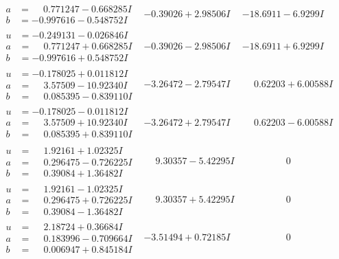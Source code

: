 \documentclass[1p]{elsarticle_modified}
\theoremstyle{definition}
\begin{document}
$$\begin{array}{c|c|c}
\begin{aligned}
a &= \phantom{-}0.771247 - 0.668285 I \\
b &= -0.997616 - 0.548752 I\end{aligned}
 & -0.39026 + 2.98506 I & -18.6911 - 6.9299 I \\ \hline\begin{aligned}
u &= -0.249131 - 0.026846 I \\
a &= \phantom{-}0.771247 + 0.668285 I \\
b &= -0.997616 + 0.548752 I\end{aligned}
 & -0.39026 - 2.98506 I & -18.6911 + 6.9299 I \\ \hline\begin{aligned}
u &= -0.178025 + 0.011812 I \\
a &= \phantom{-}3.57509 - 10.92340 I \\
b &= \phantom{-}0.085395 - 0.839110 I\end{aligned}
 & -3.26472 - 2.79547 I & \phantom{-}0.62203 + 6.00588 I \\ \hline\begin{aligned}
u &= -0.178025 - 0.011812 I \\
a &= \phantom{-}3.57509 + 10.92340 I \\
b &= \phantom{-}0.085395 + 0.839110 I\end{aligned}
 & -3.26472 + 2.79547 I & \phantom{-}0.62203 - 6.00588 I \\ \hline\begin{aligned}
u &= \phantom{-}1.92161 + 1.02325 I \\
a &= \phantom{-}0.296475 - 0.726225 I \\
b &= \phantom{-}0.39084 + 1.36482 I\end{aligned}
 & \phantom{-}9.30357 - 5.42295 I & \phantom{-0.000000 } 0 \\ \hline\begin{aligned}
u &= \phantom{-}1.92161 - 1.02325 I \\
a &= \phantom{-}0.296475 + 0.726225 I \\
b &= \phantom{-}0.39084 - 1.36482 I\end{aligned}
 & \phantom{-}9.30357 + 5.42295 I & \phantom{-0.000000 } 0 \\ \hline\begin{aligned}
u &= \phantom{-}2.18724 + 0.36684 I \\
a &= \phantom{-}0.183996 - 0.709664 I \\
b &= \phantom{-}0.006947 + 0.845184 I\end{aligned}
 & -3.51494 + 0.72185 I & \phantom{-0.000000 } 0 \\ \hline\begin{aligned}

\end{aligned}
\end{array}$$
\end{document}
